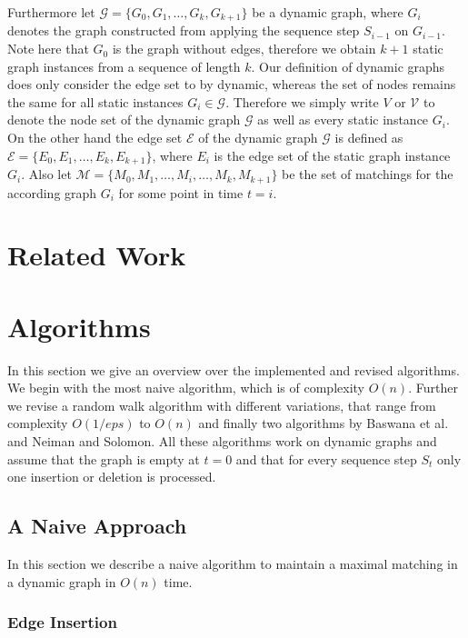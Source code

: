 \documentclass{article}      %
\begin{document}
Furthermore let $\mathcal{G}=\{G_0, G_1,\dots, G_k, G_{k+1}\}$ be a dynamic graph, where $G_i$ denotes the graph constructed from applying the sequence step $S_{i-1}$ on $G_{i-1}$. Note here that $G_0$ is the graph without edges, therefore we obtain $k+1$ static graph instances from a sequence of length $k$. Our definition of dynamic graphs does only consider the edge set to by dynamic, whereas the set of nodes remains the same for all static instances $G_i \in \mathcal{G}$. Therefore we simply write $V$ or $\mathcal{V}$ to denote the node set of the dynamic graph $\mathcal{G}$ as well as every static instance $G_i$. On the other hand the edge set $\mathcal{E}$ of the dynamic graph $\mathcal{G}$ is defined as $\mathcal{E}=\{ E_0, E_1, \dots, E_k, E_{k+1} \} $, where $E_i$ is the edge set of the static graph instance $G_i$. Also let $\mathcal{M}=\{M_0, M_1,\dots, M_i,\dots, M_k, M_{k+1}\}$ be the set of matchings for the according graph $G_i$ for some point in time $t=i$.

\pagebreak
\section{Related Work}

\pagebreak
\section{Algorithms}
\label{sec:algorithms}

In this section we give an overview over the implemented and revised algorithms. We begin with the most naive algorithm, which is of complexity $O(n)$. Further we revise a random walk algorithm with different variations, that range from complexity $O(1/eps)$ to $O(n)$ and finally two algorithms by Baswana et al. and Neiman and Solomon. All these algorithms work on dynamic graphs and assume that the graph is empty at $t=0$ and that for every sequence step $S_t$ only one insertion or deletion is processed.

\subsection{A Naive Approach}
\label{sec:naive}

In this section we describe a naive algorithm to maintain a maximal matching in a dynamic graph in $O(n)$ time.

\subsubsection{Edge Insertion}
\label{sec:naive-edge-in}
\end{document}
